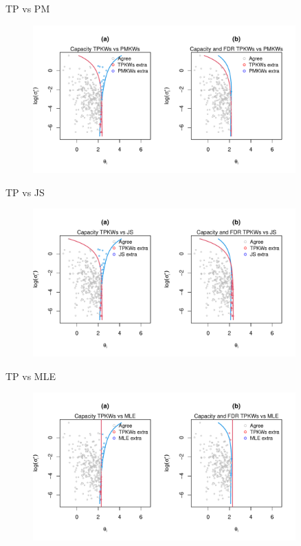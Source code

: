 \documentclass[10pt,mathserif,aspectratio=169]{beamer}
\begin{document}
\begin{frame}[label=tpcontour]{TP vs PM}
  \begin{figure}
    \centering
    \includegraphics[width=0.9\textwidth]{../../Figures/2013-2022/GMM_fd/GLmix/Contour_Left_0.2_0.1_TPKWs_PMKWs.pdf}
  \end{figure}
  \hyperlink{tpselect}{}
\end{frame}

\begin{frame}{TP vs JS}
  \begin{figure}
    \centering
    \includegraphics[width=0.9\textwidth]{../../Figures/2013-2022/GMM_fd/GLmix/Contour_Left_0.2_0.1_TPKWs_JS.pdf}
  \end{figure}
\end{frame}

\begin{frame}{TP vs MLE}
  \begin{figure}
    \centering
    \includegraphics[width=0.9\textwidth]{../../Figures/2013-2022/GMM_fd/GLmix/Contour_Left_0.2_0.1_TPKWs_MLE.pdf}
  \end{figure}
\end{frame}
\end{document}
